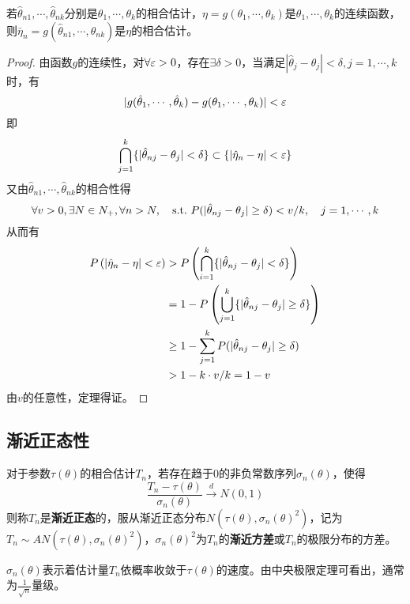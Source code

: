 \begin{theorem}[相合估计的连续映射]
    若$\hat{\theta}_{n1},\cdots,\hat{\theta}_{nk}$分别是$\theta_1,\cdots,\theta_k$的相合估计，$\eta=g(\theta_1,\cdots,\theta_k)$是$\theta_1,\cdots,\theta_k$的连续函数，则$\bar{\eta}_n=g(\hat{\theta}_{n1},\cdots,\hat{\theta}_{nk})$是$\eta$的相合估计。
\end{theorem}
\begin{proof}
    由函数$g$的连续性，对$\forall \varepsilon>0$，存在$\exists \delta>0$，当满足$|\hat{\theta}_j-\theta_j|<\delta,j=1,\cdots,k$时，有
    \[ |g(\hat{\theta}_1, \cdots, \hat{\theta}_{k})-g(\theta_1, \cdots, \theta_{k})|<\varepsilon \]
    即
    \[ \bigcap_{j=1}^k \{|\hat{\theta}_{n j}-\theta_j| < \delta\} \subset \{ | \hat\eta_n - \eta | < \varepsilon \} \]
    又由$\hat{\theta}_{n1},\cdots,\hat{\theta}_{nk}$的相合性得
    \[ \forall v>0 ,\exists N \in N_+, \forall n>N ,\quad \mathrm{s.t.}\  P(|\hat{\theta}_{n j}-\theta_{j}| \geq \delta)<v/k, \quad j=1, \cdots, k\]
    从而有
    \begin{align*}
        P\left(\left|\hat{\eta}_n -\eta\right|<\varepsilon\right) & >
        P\left(\bigcap_{i=1}^k\{|\hat{\theta}_{n j} - \theta_j|<\delta\}\right)                                                              \\
                                                         & = 1-P\left(\bigcup_{j=1}^k\{ | \hat{\theta}_{n j}-\theta_j | \geq \delta\}\right) \\
                                                         & \geq 1-\sum_{j=1}^k P(|\hat{\theta}_{n j}-\theta_j| \geq \delta)                  \\
                                                         & >1 - k \cdot v/k = 1-v
    \end{align*}
    由$v$的任意性，定理得证。
\end{proof}

\subsection{渐近正态性}

\begin{definition}[渐近正态性]
    对于参数$\tau(\theta)$的相合估计$T_n$，若存在趋于$0$的非负常数序列$\sigma_n(\theta)$，使得
    \[ \frac{T_n - \tau(\theta)}{\sigma_n(\theta)} \xrightarrow{d} N(0,1) \]
    则称$T_n$是\textbf{渐近正态}的，服从渐近正态分布$N(\tau(\theta),\sigma_n(\theta)^2)$，记为$T_n \sim AN(\tau(\theta),\sigma_n(\theta)^2)$，$\sigma_n(\theta)^2$为$T_n$的\textbf{渐近方差}或$T_n$的极限分布的方差。
\end{definition}
\begin{remark}
    $\sigma_n(\theta)$表示着估计量$T_n$依概率收敛于$\tau(\theta)$的速度。由中央极限定理可看出，通常为$\frac1{\sqrt{n} }$量级。
\end{remark}

